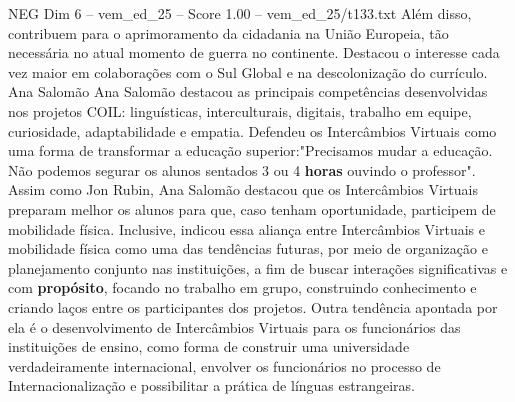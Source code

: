 \begin{textsample}{NEG Dim 6 – vem\_ed\_25 – Score 1.00 – vem\_ed\_25/t133.txt}
Além disso, contribuem para o aprimoramento da cidadania na União Europeia, tão necessária no atual momento de guerra no continente.
Destacou o interesse cada vez maior em colaborações com o Sul Global e na descolonização do currículo.
Ana Salomão Ana Salomão destacou as principais competências desenvolvidas nos projetos COIL: linguísticas, interculturais, digitais, trabalho em equipe, curiosidade, adaptabilidade e empatia.
Defendeu os Intercâmbios Virtuais como uma forma de transformar a educação superior:"Precisamos mudar a educação.
Não podemos segurar os alunos sentados 3 ou 4 \textbf{horas} ouvindo o professor".
Assim como Jon Rubin, Ana Salomão destacou que os Intercâmbios Virtuais preparam melhor os alunos para que, caso tenham oportunidade, participem de mobilidade física.
Inclusive, indicou essa aliança entre Intercâmbios Virtuais e mobilidade física como uma das tendências futuras, por meio de organização e planejamento conjunto nas instituições, a fim de buscar interações significativas e com \textbf{propósito}, focando no trabalho em grupo, construindo conhecimento e criando laços entre os participantes dos projetos.
Outra tendência apontada por ela é o desenvolvimento de Intercâmbios Virtuais para os funcionários das instituições de ensino, como forma de construir uma universidade verdadeiramente internacional, envolver os funcionários no processo de Internacionalização e possibilitar a prática de línguas estrangeiras.

\end{textsample}
